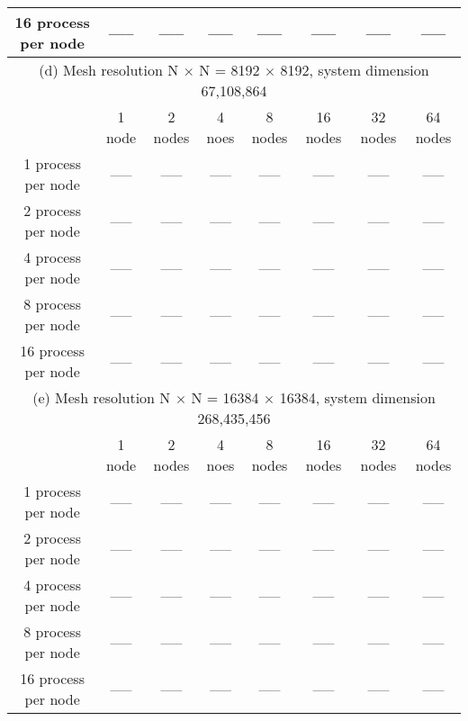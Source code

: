 \documentclass[11pt]{article}
\begin{document}
\begin{table}[!htbp]
{\begin{tabular}{ |c|c|c|c|c|c|c|c| }
16 process per node & ----- & ----- & ----- & ----- & ----- & ----- & ----- \\
\hline
\hline
\multicolumn{8}{|c|}{(d) Mesh resolution N $\times$ N = 8192 $\times$ 8192, system dimension 67,108,864}\\
\hline
 & 1 node & 2 nodes & 4 noes & 8 nodes & 16 nodes & 32 nodes & 64 nodes \\
\hline
1 process per node  & ----- & ----- & ----- & ----- & ----- & ----- & ----- \\
2 process per node  & ----- & ----- & ----- & ----- & ----- & ----- & ----- \\
4 process per node  & ----- & ----- & ----- & ----- & ----- & ----- & ----- \\
8 process per node  & ----- & ----- & ----- & ----- & ----- & ----- & ----- \\
16 process per node & ----- & ----- & ----- & ----- & ----- & ----- & ----- \\
\hline
\hline
\multicolumn{8}{|c|}{(e) Mesh resolution N $\times$ N = 16384 $\times$ 16384, system dimension 268,435,456}\\
\hline
 & 1 node & 2 nodes & 4 noes & 8 nodes & 16 nodes & 32 nodes & 64 nodes \\
\hline
1 process per node  & ----- & ----- & ----- & ----- & ----- & ----- & ----- \\
2 process per node  & ----- & ----- & ----- & ----- & ----- & ----- & ----- \\
4 process per node  & ----- & ----- & ----- & ----- & ----- & ----- & ----- \\
8 process per node  & ----- & ----- & ----- & ----- & ----- & ----- & ----- \\
16 process per node & ----- & ----- & ----- & ----- & ----- & ----- & ----- \\
\hline
\end{tabular}
}
\end{table}

\begin{table}[!htbp]
\end{table}
\pagebreak
\end{document}
